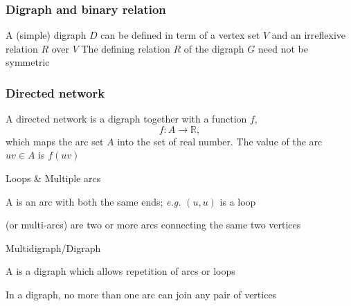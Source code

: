\documentclass[aspectratio=43]{beamer}
\begin{document}
\begin{frame}\frametitle{Digraph and binary relation}
A (simple) digraph $D$ can be defined in term of a vertex set $V$ and an irreflexive relation $R$ over $V$
\vfill
The defining relation $R$ of the digraph $G$ need not be symmetric
\end{frame}


\begin{frame}\frametitle{Directed network}
\begin{definition}
A directed network is a digraph together with a function $f$,
\[
f: A \rightarrow \mathbb{R},
\]
which maps the arc set $A$ into the set of real number. 
The value of the arc $uv \in A$ is $f(uv)$
\end{definition}
\end{frame}






\begin{frame}{Loops \& Multiple arcs}
	\begin{definition}[{Loop}]
	A  is an arc with both the same ends; \emph{e.g.} $(u,u)$ is a loop
\end{definition}
\vfill
	\begin{definition}
	 (or multi-arcs) are two or more arcs connecting the same two vertices
	\end{definition}
\end{frame}
\begin{frame}{Multidigraph/Digraph}
	\begin{definition}[{Multidigraph}]
	A  is a digraph which allows repetition of arcs or loops
	\end{definition}
	\vfill
	\begin{definition}[{Digraph}]
	In a digraph, no more than one arc can join any pair of vertices
\end{definition}
\end{frame}
\end{document}
